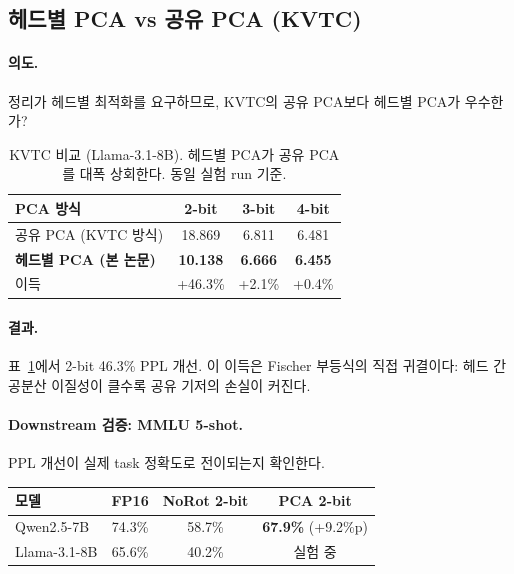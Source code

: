 \subsection{헤드별 PCA vs 공유 PCA (KVTC)}
\label{sec:exp_kvtc}

\paragraph{의도.} 정리가 헤드별 최적화를 요구하므로, KVTC의 공유 PCA보다 헤드별 PCA가 우수한가?

\begin{table}[t]
\centering
\caption{KVTC 비교 (Llama-3.1-8B). 헤드별 PCA가 공유 PCA를 대폭 상회한다. 동일 실험 run 기준.}
\label{tab:kvtc}
\small
\begin{tabular}{@{}lccc@{}}
\toprule
PCA 방식 & 2-bit & 3-bit & 4-bit \\
\midrule
공유 PCA (KVTC 방식) & 18.869 & 6.811 & 6.481 \\
\textbf{헤드별 PCA (본 논문)} & \textbf{10.138} & \textbf{6.666} & \textbf{6.455} \\
\midrule
이득 & +46.3\% & +2.1\% & +0.4\% \\
\bottomrule
\end{tabular}
\end{table}

\paragraph{결과.} 표~\ref{tab:kvtc}에서 2-bit 46.3\% PPL 개선. 이 이득은 Fischer 부등식의 직접 귀결이다: 헤드 간 공분산 이질성이 클수록 공유 기저의 손실이 커진다.

\paragraph{Downstream 검증: MMLU 5-shot.} PPL 개선이 실제 task 정확도로 전이되는지 확인한다.

\begin{center}
\small
\begin{tabular}{@{}lccc@{}}
\toprule
모델 & FP16 & NoRot 2-bit & \textbf{PCA 2-bit} \\
\midrule
Qwen2.5-7B & 74.3\% & 58.7\% & \textbf{67.9\%} (+9.2\%p) \\
Llama-3.1-8B & 65.6\% & 40.2\% & 실험 중 \\
\bottomrule
\end{tabular}
\end{center}

